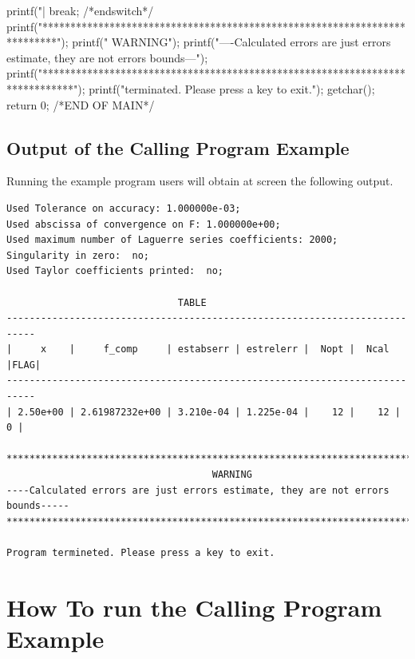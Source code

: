 \documentclass[10pt]{article}
\begin{document}
\begin{c_code}
{{		printf("| %
		break;
	} /*endswitch*/
	printf("\n***************************************************************************\n");
	printf("                 	               WARNING\n");
	printf("----Calculated errors are just errors estimate, they are not errors bounds---\n");
	printf("*****************************************************************************\n");
	printf("\n\nProgram terminated. Please press a key to exit.");	getchar();
	return 0;
}
/*END OF MAIN*/

\end{c_code}

\restoregeometry



\subsection{Output of the Calling Program Example}

Running the example program users will obtain at screen the following output.



\begin{verbatim}
Used Tolerance on accuracy: 1.000000e-03;
Used abscissa of convergence on F: 1.000000e+00;
Used maximum number of Laguerre series coefficients: 2000;
Singularity in zero:  no;
Used Taylor coefficients printed:  no;

			                  TABLE
---------------------------------------------------------------------------
|     x    |     f_comp     | estabserr | estrelerr |  Nopt |  Ncal |FLAG|
---------------------------------------------------------------------------
| 2.50e+00 | 2.61987232e+00 | 3.210e-04 | 1.225e-04 |    12 |    12 |  0 |

*******************************************************************************
                                    WARNING
----Calculated errors are just errors estimate, they are not errors bounds-----
*******************************************************************************

Program termineted. Please press a key to exit.

\end{verbatim}


\section{How To run the Calling Program Example}
\end{document}
